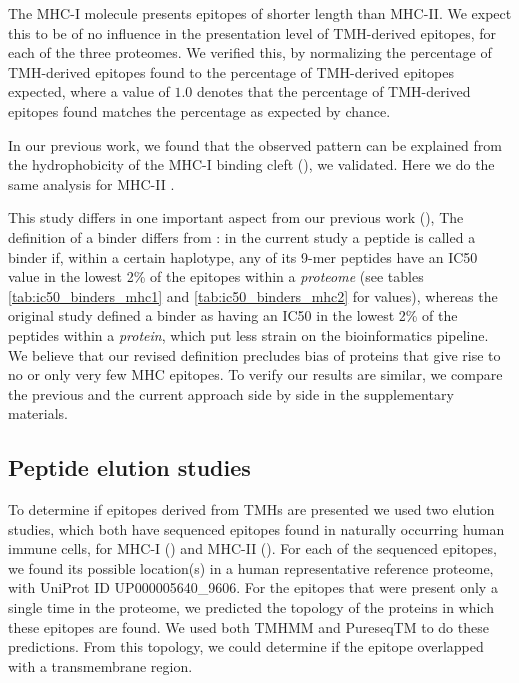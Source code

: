 The MHC-I molecule presents epitopes of shorter length than MHC-II.
We expect this to be of no influence in the presentation level
of TMH-derived epitopes, for each of the three proteomes.
We verified this, by normalizing the percentage of TMH-derived epitopes found
to the percentage of TMH-derived epitopes expected, 
where a value of $1.0$ denotes that the percentage of TMH-derived epitopes found
matches the percentage as expected by chance.

In our previous work, we found that the observed pattern can be
explained from the hydrophobicity of the MHC-I binding 
cleft (\cite{bianchi2017}), we validated.
Here we do the same analysis for MHC-II 
.

This study differs in one important aspect from our previous work (\cite{bianchi2017}), 
The definition of a binder differs from \cite{bianchi2017}:
in the current study a peptide is called a binder if, within a certain haplotype, 
any of its 9-mer peptides have an IC50 value in the lowest 2\% of 
the epitopes within a 
\emph{proteome} (see tables \ref{tab:ic50_binders_mhc1} and \ref{tab:ic50_binders_mhc2}
for values), whereas the original study defined
a binder as having an IC50 in the lowest 2\% 
of the peptides within a \emph{protein}, 
which put less strain on the bioinformatics pipeline.
We believe that our revised definition precludes bias of proteins 
that give rise to no or only very few MHC epitopes.
To verify our results are similar,
we compare the previous and the
current approach side by side in the supplementary materials.

\subsection{Peptide elution studies}\label{subsec:elution_studies}

To determine if epitopes derived from TMHs are presented 
we used two elution studies, which both have sequenced
epitopes found in naturally occurring human immune cells,
for MHC-I (\cite{schellens2015comprehensive}) 
and MHC-II (\cite{bergseng2015different}).
For each of the sequenced epitopes,
we found its possible location(s) in 
a human representative reference proteome,
with UniProt ID UP000005640\_9606.
For the epitopes that were present only a single time in the proteome,
we predicted the topology of the proteins in which these epitopes are found.
We used both TMHMM and PureseqTM to do these predictions. 
From this topology, we could determine if the epitope
overlapped with a transmembrane region.

